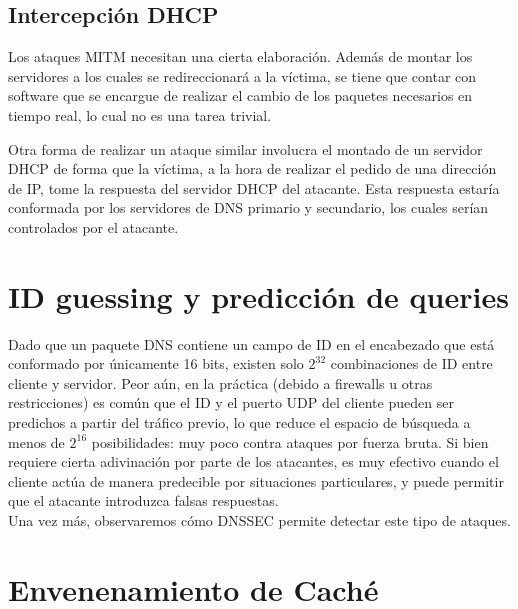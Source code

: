 \subsection{Intercepci\'on DHCP}

Los ataques MITM necesitan una cierta elaboraci\'on. Adem\'as de montar los
servidores a los cuales se redireccionar\'a a la v\'ictima, se tiene que contar
con software que se encargue de realizar el cambio de los paquetes necesarios en
tiempo real, lo cual no es una tarea trivial. 

Otra forma de realizar un ataque similar involucra el montado de un servidor
DHCP de forma que la v\'ictima, a la hora de realizar el pedido de una
direcci\'on de IP, tome la respuesta del servidor DHCP del atacante. Esta
respuesta estar\'ia conformada por los servidores de DNS primario y secundario,
los cuales ser\'ian controlados por el atacante.

\section{ID guessing y predicci\'on de queries}

Dado que un paquete DNS contiene un campo de ID en el encabezado que est\'a conformado por \'unicamente 16 bits, existen solo $2^{32}$ combinaciones de ID entre cliente y servidor. Peor a\'un, en la pr\'actica (debido a firewalls u otras restricciones) es com\'un que el ID y el puerto UDP del cliente pueden ser predichos a partir del tr\'afico previo, lo que reduce el espacio de b\'usqueda a menos de $2^{16}$ posibilidades: muy poco contra ataques por fuerza bruta. Si bien requiere cierta adivinaci\'on por parte de los atacantes, es muy efectivo cuando el cliente act\'ua de manera predecible por situaciones particulares, y puede permitir que el atacante introduzca falsas respuestas.\\
Una vez m\'as, observaremos c\'omo DNSSEC permite detectar este tipo de ataques.

\section{Envenenamiento de Cach\'e}

